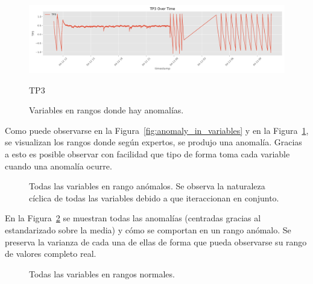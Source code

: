 \documentclass[12pt,letterpaper]{article}
\begin{document}
\begin{figure}[htp]
    \begin{minipage}[b]{0.45\textwidth}
        \centering
        \includegraphics[width=\textwidth]{TP3.png}
        \caption*{TP3}
    \end{minipage}

    \caption{Variables en rangos donde hay anomalías.}
    \label{fig:anomaly_in_variables2}
\end{figure}

Como puede observarse en la Figura~\ref{fig:anomaly_in_variables} y en la Figura~\ref{fig:anomaly_in_variables2}, se visualizan los rangos donde según expertos, se produjo una anomalía. Gracias a esto es posible observar con facilidad que tipo de forma toma cada variable cuando una anomalía ocurre.

\begin{figure}[htp]
    \centering
    \caption{Todas las variables en rango anómalos. Se observa la naturaleza cíclica de todas las variables debido a que iteraccionan en conjunto.}
    \label{fig:all_anomalies}
\end{figure}

En la Figura~\ref{fig:all_anomalies} se muestran todas las anomalías (centradas gracias al estandarizado sobre la media) y cómo se comportan en un rango anómalo. Se preserva la varianza de cada una de ellas de forma que pueda observarse su rango de valores completo real.

\begin{figure}[htp]
    \centering
    \caption{Todas las variables en rangos normales.}
    \label{fig:all_normal}
\end{figure}
\end{document}
